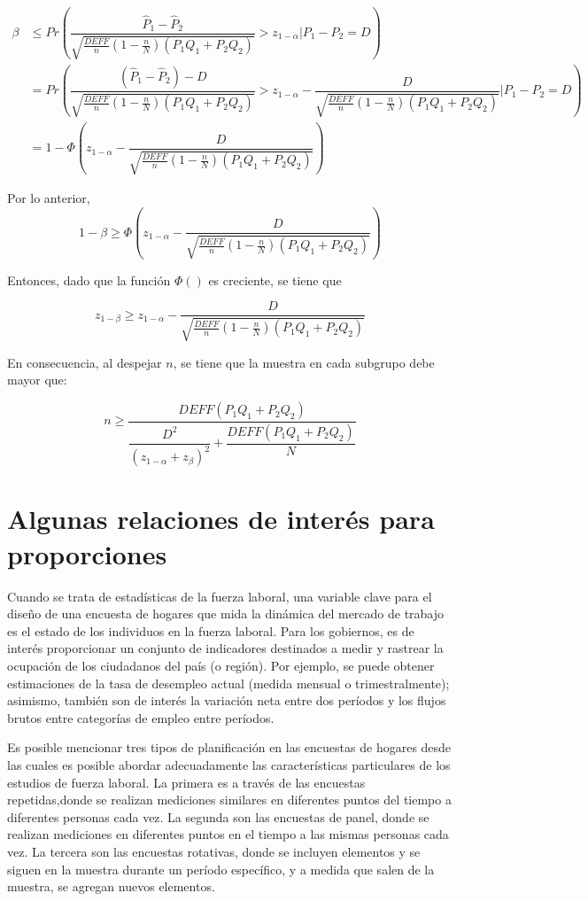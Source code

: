 \documentclass[
  12pt,
  spanish,
]{book}
\begin{document}
\begin{align*}
\beta &\leq Pr\left(\dfrac{\hat{P}_1-\hat{P}_2}{\sqrt{\frac{DEFF}{n}\left(1-\frac{n}{N}\right)(P_1Q_1+P_2Q_2)}} > z_{1-\alpha} \left. | \right. P_1 -P_2 =D \right)\\
&= Pr\left(\dfrac{(\hat{P}_1-\hat{P}_2)-D}{\sqrt{\frac{DEFF}{n}\left(1-\frac{n}{N}\right)(P_1Q_1+P_2Q_2)}} > z_{1-\alpha} - \dfrac{D}{\sqrt{\frac{DEFF}{n}\left(1-\frac{n}{N}\right)(P_1Q_1+P_2Q_2)}} | P_1 -P_2 =D
\right)\\
&= 1-\Phi\left(z_{1-\alpha} - \dfrac{D}{\sqrt{\frac{DEFF}{n}\left(1-\frac{n}{N}\right)(P_1Q_1+P_2Q_2)}} \right)
\end{align*}

Por lo anterior,
\[
1-\beta \geq \Phi\left(z_{1-\alpha} - \dfrac{D}{\sqrt{\frac{DEFF}{n}\left(1-\frac{n}{N}\right)(P_1Q_1+P_2Q_2)}} \right)
\]

Entonces, dado que la función \(\Phi()\) es creciente, se tiene que

\[
z_{1-\beta} \geq z_{1-\alpha} - \dfrac{D}{\sqrt{\frac{DEFF}{n}\left(1-\frac{n}{N}\right)(P_1Q_1+P_2Q_2)}} 
\]

En consecuencia, al despejar \(n\), se tiene que la muestra en cada subgrupo debe mayor que:

\[
n \geq \dfrac{DEFF(P_1Q_1+P_2Q_2)}{\dfrac{D^2}{(z_{1-\alpha}+z_{\beta})^2}+\dfrac{DEFF(P_1Q_1+P_2Q_2)}{N}}
\]

\hypertarget{algunas-relaciones-de-interuxe9s-para-proporciones}{%
\section{Algunas relaciones de interés para proporciones}\label{algunas-relaciones-de-interuxe9s-para-proporciones}}

Cuando se trata de estadísticas de la fuerza laboral, una variable clave para el diseño de una encuesta de hogares que mida la dinámica del mercado de trabajo es el estado de los individuos en la fuerza laboral. Para los gobiernos, es de interés proporcionar un conjunto de indicadores destinados a medir y rastrear la ocupación de los ciudadanos del país (o región). Por ejemplo, se puede obtener estimaciones de la tasa de desempleo actual (medida mensual o trimestralmente); asimismo, también son de interés la variación neta entre dos períodos y los flujos brutos entre categorías de empleo entre períodos.

Es posible mencionar tres tipos de planificación en las encuestas de hogares desde las cuales es posible abordar adecuadamente las características particulares de los estudios de fuerza laboral. La primera es a través de las encuestas repetidas,donde se realizan mediciones similares en diferentes puntos del tiempo a diferentes personas cada vez. La segunda son las encuestas de panel, donde se realizan mediciones en diferentes puntos en el tiempo a las mismas personas cada vez. La tercera son las encuestas rotativas, donde se incluyen elementos y se siguen en la muestra durante un período específico, y a medida que salen de la muestra, se agregan nuevos elementos.
\end{document}
